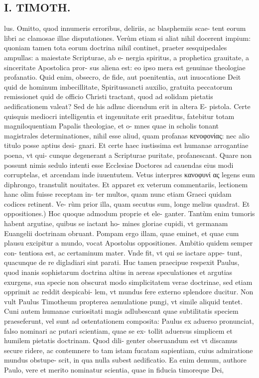 \documentclass{article}
\begin{document}
\begin{pages}
\section*{I. TIMOTH. }
\marginpar{[ p.86 ]}\pstart lus. Omitto, quod innumeris erroribus, deliriis, ac blasphemiis scae- tent eorum libri ac clamosae illae disputationes. Verùm etiam si aliat nihil docerent impium: quoniam tamen tota eorum doctrina nihil continet, praeter sesquipedales ampullas: a maiestate Scripturae, ab e- nergia spiritus, a prophetica grauitate, a sinceritate Apostolica pror- sus aliena est: eo ipso mera est genuinae theologiae profanatio. Quid enim, obsecro, de fide, aut poenitentia, aut inuocatione Deit quid de hominum imbecillitate, Spiritussancti auxilio, gratuita peccatorum remissionet quid de officio Christi tractant, quod ad solidam pietatis aedificationem valeat? Sed de his adhuc dicendum erit in altera E- pistola. Certe quisquis mediocri intelligentia et ingenuitate erit praeditus, fatebitur totam magniloquentiam Papalis theologiae, et o- mnes quae in scholis tonant magistrales determinationes, nihil esse aliud, quam profanas κενοφονίας: nec alio titulo posse aptius desi- gnari. Et certe haec iustissima est humanae arrogantiae poena, vt qui- cunque degenerant a Scripturae puritate, profanescant. Quare non possunt nimis sedulo intenti esse Ecclesiae Doctores ad cauendas eius modi corruptelas, et arcendam inde iuuentutem. Vetus interpres κανοφυνί ας legens eum diphrongo, transtulit nouitates. Et apparet ex veterum commentariis, lectionem hanc olim fuisse receptam in- ter multos, quam nunc etiam Graeci quidam codices retinent. Ve- rùm prior illa, quam secutus sum, longe melius quadrat.  \pend\pstart Et oppositiones.) Hoc quoque admodum proprie et ele- ganter. Tantùm enim tumoris habent argutiae, quibus se iactant ho- mines gloriae cupidi, vt germanam Euangelii doctrinam obruant. Pompam ergo illam, quae eminet, et quae cum plausu excipitur a mundo, vocat Apostolus oppositiones. Ambitio quidem semper con- tentiosa est, ac certaminum mater. Vnde fit, vt qui se iactare appe- tunt, quacunque de re digladiari sint parati. Huc tamen praecipue respexit Paulus, quod inanis sophistarum doctrina altius in aereas speculationes et argutias exurgens, sua specie non obscurat modo simplicitatem verae doctrinae, sed etiam opprimit ac reddit despicabi- lem, vt mundus fere externo splendore ducitur. Non vult Paulus Timotheum propterea aemulatione pungi, vt simile aliquid tentet. Cuni autem humanae curiositati magis adlubescant quae subtilitatis speciem praeseferunt, vel sunt ad ostentationem composita: Paulus ex aduerso pronunciat, falso nominari ac putari scientiam, quae se ex- tollit aduersus simplicem et humilem pietatis doctrinam. Quod dili- genter obseruandum est vt discamus secure ridere, ac contemnere to tam istam fucatam sapientiam, cuius admiratione mundus obstupe- scit, in qua nulla subest aedificatio. Ea enim demum, authore Paulo, vere et merito nominatur scientia, quae in fiducia timoreque Dei,  \pend

\end{pages}
\end{document}
